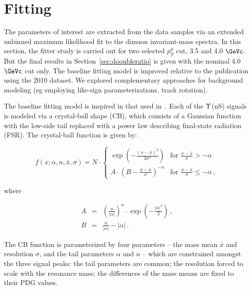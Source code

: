 \chapter{Fitting}
The parameters of interest are extracted from the data samples via an extended unbinned maximum likelihood fit to the dimuon invariant-mass spectra.
In this section, the fitter study is carried out for two selected $p_{T}^{\mu}$ cut, 3.5 and 4.0 $\GeVc$. 
But the final results in Section~\ref{sec:dooubleratio} is given with the nominal 4.0 $\GeVc$ cut only. 
The baseline fitting model is improved relative to the publication using the 2010 dataset. We explored complementary approaches for background modeling (eg employing like-sign parameterizations, track rotation).
%

The baseline fitting model is inspired in that used in~\cite{CMS_AN_2010-140, CMS_AN_2011_062}. 
%
Each of the $\Upsilon$(nS) signals is modeled via a crystal-ball shape (CB), 
which consists of a Gaussian function with the low-side tail replaced with a power law describing final-state radiation (FSR). 
%
The crystal-ball function is given by:
%
\begin{linenomath}
\begin{equation}
  f(x;\alpha,n,\bar x,\sigma) = N \cdot \left\{
  \begin{array}{ll}
    \exp(- \frac{(x -\bar x)^2}{2 \sigma^2})      & \mbox{for } \frac{x - \bar x}{\sigma} > -\alpha \\ 
    A \cdot (B - \frac{x - \bar x}{\sigma})^{-n}  & \mbox{for } \frac{x - \bar x}{\sigma} \leq -\alpha \,,
  \end{array} 
  \right.
\end{equation}
\end{linenomath}
%
where 
\begin{linenomath}
\begin{eqnarray}
  A & = & \left(\frac{n}{\left| \alpha \right|}\right)^n \cdot \exp\left(- \frac {\left| \alpha \right|^2}{2}\right) \,, \nonumber \\
  B & = & \frac{n}{\left| \alpha \right|} - \left| \alpha \right| \,. \nonumber
\end{eqnarray}
\end{linenomath}
%
The CB function is parameterized by four parameters -- the mass mean $\bar x$ and resolution $\sigma$, and the tail parameters $\alpha$ and $n$ -- which are constrained amongst the three signal peaks:    
the tail parameters are common; 
the resolution  forced to scale with the resonance mass;  
the differences of the mass means are fixed to their PDG values. %

